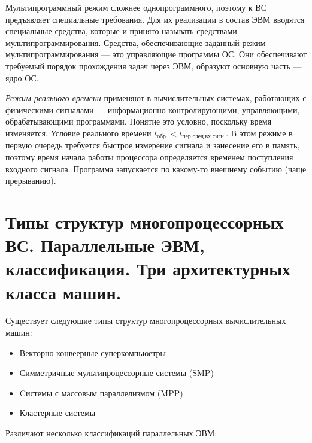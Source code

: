 \documentclass[unicode, 12pt, a4paper, oneside]{article}
\begin{document}
Мультипрограммный режим сложнее однопрограммного, поэтому к ВС предъявляет специальные требования. Для их реализации в состав ЭВМ вводятся специальные средства, которые и принято называть средствами мультипрограммирования. Средства, обеспечивающие заданный режим мультипрограммирования --- это управляющие программы ОС. Они обеспечивают требуемый порядок прохождения задач через ЭВМ, образуют основную часть --- ядро ОС.

\textit{Режим реального времени} применяют в вычислительных системах, работающих с физическими сигналами --- информационно-контролирующими, управляющими, обрабатывающими программами. Понятие это условно, поскольку время изменяется. Условие реального времени $ t_\text{обр.} < t_\text{пер.след.вх.сигн.}$. В этом режиме в первую очередь требуется быстрое измерение сигнала и занесение его в память, поэтому время начала работы процессора определяется временем поступления входного сигнала. Программа запускается по какому-то внешнему событию (чаще прерыванию).


\section{Типы структур многопроцессорных ВС. Параллельные ЭВМ, классификация. Три архитектурных класса машин.}

Существует следующие типы структур многопроцессорных вычислительных машин:

\begin{itemize}
\item Векторно-конвеерные суперкомпьюетры
\item Симметричные мультипроцессорные системы (SMP)
\item Cистемы с массовым параллелизмом (MPP)
\item Кластерные системы
\end{itemize} 

Различают несколько классификаций параллельных ЭВМ:
\end{document}

